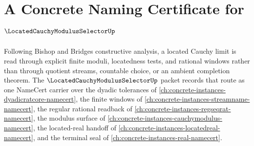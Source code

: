 \chapter{A Concrete Naming Certificate for $\LocatedCauchyModulusSelectorUp$}
\label{ch:concrete-instances-located-cauchy-modulus-selector-namecert}

Following Bishop and Bridges constructive analysis, a located Cauchy limit is read through explicit finite moduli, locatedness tests, and rational windows rather than through quotient streams, countable choice, or an ambient completion theorem. The $\LocatedCauchyModulusSelectorUp$ packet records that route as one NameCert carrier over the dyadic tolerances of \autoref{ch:concrete-instances-dyadicratcore-namecert}, the finite windows of \autoref{ch:concrete-instances-streamname-namecert}, the regular rational readback of \autoref{ch:concrete-instances-regseqrat-namecert}, the modulus surface of \autoref{ch:concrete-instances-cauchymodulus-namecert}, the located-real handoff of \autoref{ch:concrete-instances-locatedreal-namecert}, and the terminal seal of \autoref{ch:concrete-instances-real-namecert}.


